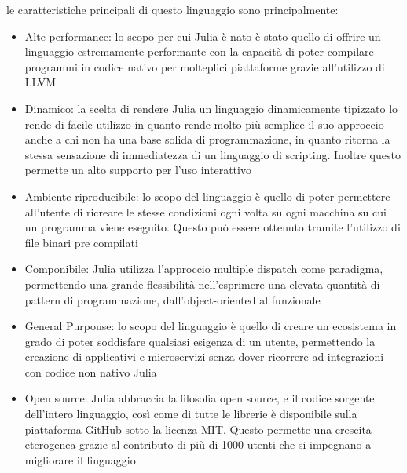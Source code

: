 le caratteristiche principali di questo linguaggio sono 
principalmente:
\begin{itemize}
    \item Alte performance: lo scopo per cui Julia è nato è 
    stato quello di offrire un linguaggio estremamente 
    performante con la capacità di poter compilare programmi 
    in codice nativo per molteplici piattaforme grazie 
    all’utilizzo di LLVM


    \item Dinamico: la scelta di rendere Julia un linguaggio 
    dinamicamente tipizzato lo rende di facile utilizzo in 
    quanto rende molto più semplice il suo approccio anche a 
    chi non ha una base solida di programmazione, in quanto 
    ritorna la stessa sensazione di immediatezza di un 
    linguaggio di scripting. Inoltre questo permette un alto 
    supporto per l’uso interattivo


    \item Ambiente riproducibile: lo scopo del linguaggio è 
    quello di poter permettere all’utente di ricreare le 
    stesse condizioni ogni volta su ogni macchina su cui un 
    programma viene eseguito. Questo può essere ottenuto 
    tramite l’utilizzo di file binari pre compilati
    \item Componibile: Julia utilizza l’approccio multiple 
    dispatch come paradigma, permettendo una grande 
    flessibilità nell’esprimere una elevata quantità di 
    pattern di programmazione, dall’object-oriented al 
    funzionale
    \item General Purpouse: lo scopo del linguaggio è quello 
    di creare un ecosistema in grado di poter soddisfare 
    qualsiasi esigenza di un utente, permettendo la creazione 
    di applicativi e microservizi senza dover ricorrere ad 
    integrazioni con codice non nativo Julia
    \item Open source: Julia abbraccia la filosofia open source, 
    e il codice sorgente dell’intero linguaggio, così come di 
    tutte le librerie è disponibile sulla piattaforma GitHub 
    sotto la licenza MIT. Questo permette una crescita 
    eterogenea grazie al contributo di più di 1000 utenti 
    che si impegnano a migliorare il linguaggio
\end{itemize}

